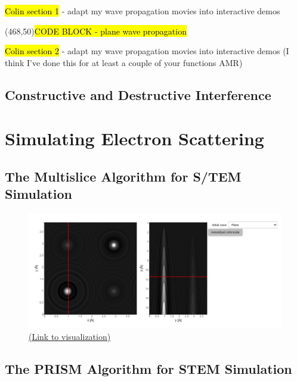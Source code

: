 \documentclass[%
 superscriptaddress,
 aip,
 amsmath,amssymb,
preprint,%
 author-year,%
longbibliography
]{revtex4-2}
\begin{document}
\hl{Colin section 1}  - adapt my wave propagation movies into interactive demos

\framebox(468,50){\hl{CODE BLOCK - plane wave propagation}}

\hl{Colin section 2}  - adapt my wave propagation movies into interactive demos (I think I've done this for at least a couple of your functions AMR)

\subsection*{Constructive and Destructive Interference}


\section*{Simulating Electron Scattering}\label{electron_sacttering}


\subsection*{The Multislice Algorithm for S/TEM Simulation}

\begin{figure}[h]
    \includegraphics[width=1\textwidth]{figures/3d_wavefunction.png}
    \caption{ \href{https://tem-elements.herokuapp.com/voila/render/notebooks/3D_wavefunction.ipynb}{(Link to visualization)}}
    \label{vis:3d_wavefunction}
\end{figure}

\subsection*{The PRISM Algorithm for STEM Simulation}

\end{document}
